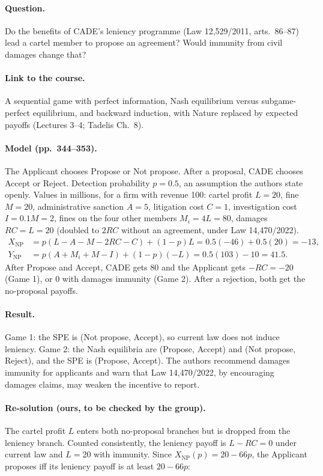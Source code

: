 \documentclass[11pt,a4paper]{article}
\begin{document}
\paragraph{Question.} Do the benefits of CADE's leniency programme (Law 12,529/2011, arts.\ 86--87)
lead a cartel member to propose an agreement? Would immunity from civil damages change that?

\paragraph{Link to the course.} A sequential game with perfect information, Nash equilibrium versus
subgame-perfect equilibrium, and backward induction, with Nature replaced by expected payoffs
(Lectures 3--4; Tadelis Ch.~8).

\paragraph{Model (pp.\ 344--353).} The Applicant chooses Propose or Not propose. After a proposal,
CADE chooses Accept or Reject. Detection probability $p=0.5$, an assumption the authors state
openly. Values in millions, for a firm with revenue 100:
cartel profit $L=20$, fine $M=20$, administrative sanction $A=5$, litigation cost $C=1$,
investigation cost $I=0.1M=2$, fines on the four other members $M_i=4L=80$, damages $RC=L=20$
(doubled to $2RC$ without an agreement, under Law 14,470/2022).
\begin{align*}
X_{\text{NP}} &= p(L-A-M-2RC-C)+(1-p)L = 0.5(-46)+0.5(20) = -13,\\
Y_{\text{NP}} &= p(A+M_i+M-I)+(1-p)(-L) = 0.5(103)-10 = 41.5.
\end{align*}
After Propose and Accept, CADE gets $80$ and the Applicant gets $-RC=-20$ (Game 1), or $0$ with
damages immunity (Game 2). After a rejection, both get the no-proposal payoffs.

\paragraph{Result.} Game 1: the SPE is (Not propose, Accept), so current law does not induce
leniency. Game 2: the Nash equilibria are (Propose, Accept) and (Not propose, Reject), and the SPE
is (Propose, Accept). The authors recommend damages immunity for applicants and warn that Law
14,470/2022, by encouraging damages claims, may weaken the incentive to report.

\paragraph{Re-solution (ours, to be checked by the group).} The cartel profit $L$ enters both
no-proposal branches but is dropped from the leniency branch. Counted consistently, the leniency
payoff is $L-RC=0$ under current law and $L=20$ with immunity. Since $X_{\text{NP}}(p)=20-66p$,
the Applicant proposes iff its leniency payoff is at least $20-66p$:
\end{document}
